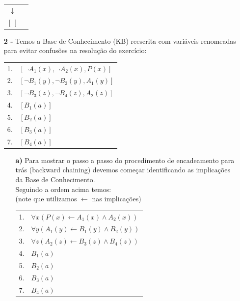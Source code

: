 \documentclass[12pt]{article}
\begin{document}
\begin{itemize}
\begin{center}
\begin{tabular}{c c}
					$\downarrow$ & \\
					$[ \ ]$ & \\
				\end{tabular}
			\end{center}
		\item[\textbf{2 -}]
			\hfill\newline
			Temos a Base de Conhecimento (KB) reescrita com variáveis renomeadas para evitar 
			confusões	na resolução do exercício:
			\begin{center}
				\begin{tabular}{c l}
				1. & $[\neg A_1(x), \neg A_2(x), P(x)]$\\
				2. & $[\neg B_1(y), \neg B_2(y), A_1(y)]$\\
				3. & $[\neg B_3(z), \neg B_4(z), A_2(z)]$\\
				4. & $[B_1(a)]$\\
				5. & $[B_2(a)]$\\
				6. & $[B_3(a)]$\\
				7. & $[B_4(a)]$\\
				\end{tabular}
			\end{center}
			\newpage
			\begin{itemize}	
				\item[\textbf{a) }]					
					\hfill\newline
					Para mostrar o passo a passo do procedimento de encadeamento para
					trás (backward chaining) devemos começar identificando as implicações
					da Base de Conhecimento.\\
					Seguindo a ordem acima temos:\\ 
					(note que utilizamos $\leftarrow$ nas implicações)\\
					\begin{center}
						\begin{tabular}{c l}
							1. & $\forall x (P(x) \leftarrow A_1(x) \land A_2(x))$\\
							2. & $\forall y (A_1(y) \leftarrow B_1(y) \land B_2(y))$\\
							3. & $\forall z (A_2(z) \leftarrow B_3(z) \land B_4(z))$\\
							4. & $B_1(a)$\\
							5. & $B_2(a)$\\
							6. & $B_3(a)$\\
							7. & $B_4(a)$\\
						\end{tabular}
					\end{center}

\end{itemize}
\end{itemize}
\end{document}
